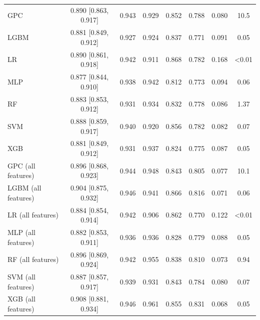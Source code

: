 \begin{tabular}{lccccccc}
GPC & 0.890 [0.863, 0.917] & 0.943 & 0.929 & 0.852 & 0.788 & 0.080 & 10.5 \\
LGBM & 0.881 [0.849, 0.912] & 0.927 & 0.924 & 0.837 & 0.771 & 0.091 & 0.05 \\
LR & 0.890 [0.861, 0.918] & 0.942 & 0.911 & 0.868 & 0.782 & 0.168 & <0.01 \\
MLP & 0.877 [0.844, 0.910] & 0.938 & 0.942 & 0.812 & 0.773 & 0.094 & 0.06 \\
RF & 0.883 [0.853, 0.912] & 0.931 & 0.934 & 0.832 & 0.778 & 0.086 & 1.37 \\
SVM & 0.888 [0.859, 0.917] & 0.940 & 0.920 & 0.856 & 0.782 & 0.082 & 0.07 \\
XGB & 0.881 [0.849, 0.912] & 0.931 & 0.937 & 0.824 & 0.775 & 0.087 & 0.05 \\
\midrule
GPC (all features) & 0.896 [0.868, 0.923] & 0.944 & 0.948 & 0.843 & 0.805 & 0.077 & 10.1 \\
LGBM (all features) & 0.904 [0.875, 0.932] & 0.946 & 0.941 & 0.866 & 0.816 & 0.071 & 0.06 \\
LR (all features) & 0.884 [0.854, 0.914] & 0.942 & 0.906 & 0.862 & 0.770 & 0.122 & <0.01 \\
MLP (all features) & 0.882 [0.853, 0.911] & 0.936 & 0.936 & 0.828 & 0.779 & 0.088 & 0.05 \\
RF (all features) & 0.896 [0.869, 0.924] & 0.942 & 0.955 & 0.838 & 0.810 & 0.073 & 0.94 \\
SVM (all features) & 0.887 [0.857, 0.917] & 0.939 & 0.931 & 0.843 & 0.784 & 0.080 & 0.07 \\
XGB (all features) & 0.908 [0.881, 0.934] & 0.946 & 0.961 & 0.855 & 0.831 & 0.068 & 0.05 \\
\bottomrule
\end{tabular}